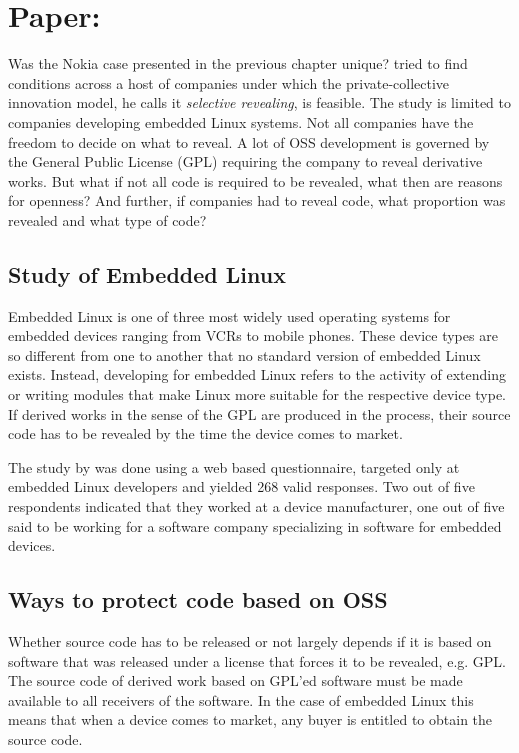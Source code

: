 \documentclass[a4paper]{scrartcl}
\newcommand{\todo}[1]{{\it \color{gray} #1}}
\begin{document}
\section{Paper: }

\todo{}

Was the Nokia case presented in the previous chapter unique? 
\textcite{henkel2006selective} tried to find conditions across a host of companies under which the private-collective innovation model, he calls it \emph{selective revealing}, is feasible.
The study is limited to companies developing embedded Linux systems.
Not all companies have the freedom to decide on what to reveal.
A lot of OSS development is governed by the General Public License (GPL) requiring the company to reveal derivative works.
But what if  not all code is required to be revealed, what then are reasons for openness? 
And further, if companies had to reveal code, what proportion was revealed and what type of code?

\subsection{Study of Embedded Linux}

Embedded Linux is one of three most widely used operating systems for embedded devices ranging from VCRs to mobile phones.
These device types are so different from one to another that no standard version of embedded Linux exists.
Instead, developing for embedded Linux refers to the activity of extending or writing modules that make Linux more suitable for the respective device type.
If derived works in the sense of the GPL are produced in the process, their source code has to be revealed by the time the device comes to market.

The study by \textcite{henkel2006selective} was done using a web based questionnaire, targeted only at embedded Linux developers and yielded 268 valid responses.
Two out of five respondents indicated that they worked at a device manufacturer, one out of five said to be working for a software company specializing in software for embedded devices.


\subsection{Ways to protect code based on OSS}

Whether source code has to be released or not largely depends if it is based on software that was released under a license that forces it to be revealed, e.g. GPL.
The source code of derived work based on GPL’ed software must be made available to all receivers of the software. 
In the case of embedded Linux this means that when a device comes to market, any buyer is entitled to obtain the source code.
\end{document}
